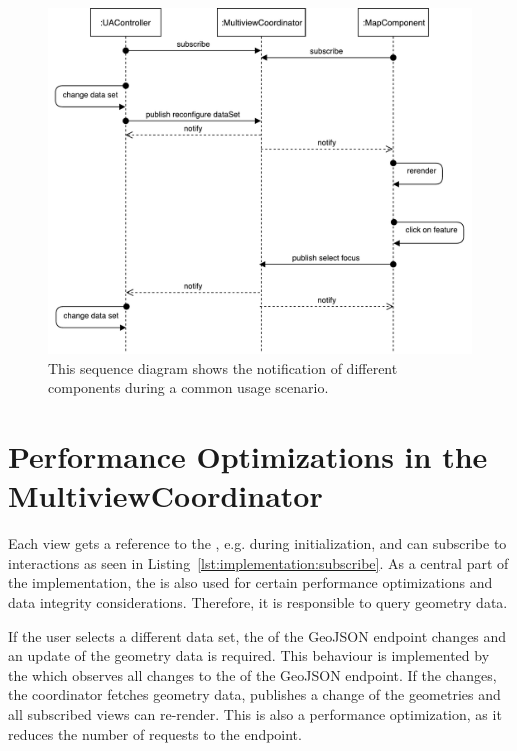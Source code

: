 \begin{figure}[ht]
  \centering
  \includegraphics[width=\textwidth]{figures/implementation/SequenceDiagram}
  \caption{%
    This sequence diagram shows the notification of different components during a common usage scenario.
  }\label{fig:implementation:sequence-diagram}
\end{figure}


\section{Performance Optimizations in the MultiviewCoordinator}

Each view gets a reference to the , e.g. during initialization, and can subscribe to interactions as seen in Listing~\ref{lst:implementation:subscribe}.
As a central part of the implementation, the  is also used for certain performance optimizations and data integrity considerations.
Therefore, it is responsible to query geometry data.

If the user selects a different data set, the  of the GeoJSON endpoint changes and an update of the geometry data is required.
This behaviour is implemented by the  which observes all changes to the  of the GeoJSON endpoint.
If the  changes, the coordinator fetches geometry data, publishes a change of the geometries and all subscribed views can re-render.
This is also a performance optimization, as it reduces the number of requests to the  endpoint.

